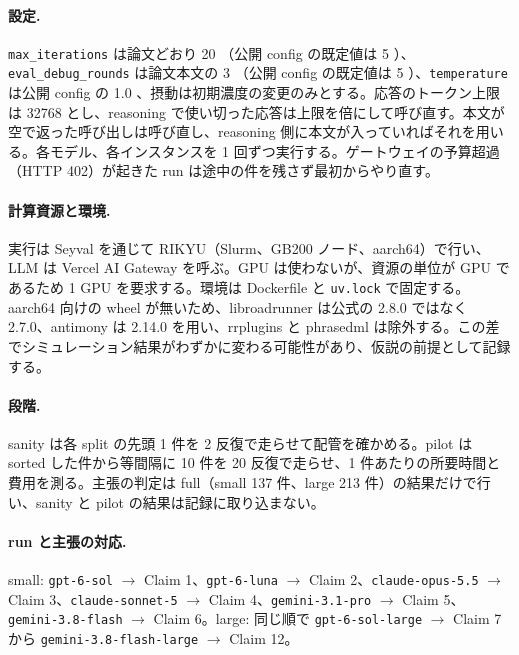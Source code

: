 \documentclass{article}
\begin{document}
\paragraph{設定.}
\texttt{max\_iterations} は論文どおり 20 \cite[s1.p3]{duan-2025-measuring}（公開 config の既定値は 5 \cite[s2.p2]{h4duan-2025-scigym}）、\texttt{eval\_debug\_rounds} は論文本文の 3 \cite[s1.p4]{duan-2025-measuring}（公開 config の既定値は 5 \cite[s2.p3]{h4duan-2025-scigym}）、\texttt{temperature} は公開 config の 1.0 \cite[s2.p1]{h4duan-2025-scigym}、摂動は初期濃度の変更のみとする。応答のトークン上限は 32768 とし、reasoning で使い切った応答は上限を倍にして呼び直す。本文が空で返った呼び出しは呼び直し、reasoning 側に本文が入っていればそれを用いる。各モデル、各インスタンスを 1 回ずつ実行する。ゲートウェイの予算超過（HTTP 402）が起きた run は途中の件を残さず最初からやり直す。

\paragraph{計算資源と環境.}
実行は Seyval を通じて RIKYU（Slurm、GB200 ノード、aarch64）で行い、LLM は Vercel AI Gateway を呼ぶ。GPU は使わないが、資源の単位が GPU であるため 1 GPU を要求する。環境は Dockerfile と \texttt{uv.lock} で固定する。aarch64 向けの wheel が無いため、libroadrunner は公式の 2.8.0 ではなく 2.7.0、antimony は 2.14.0 を用い、rrplugins と phrasedml は除外する。この差でシミュレーション結果がわずかに変わる可能性があり、仮説の前提として記録する。

\paragraph{段階.}
sanity は各 split の先頭 1 件を 2 反復で走らせて配管を確かめる。pilot は sorted した件から等間隔に 10 件を 20 反復で走らせ、1 件あたりの所要時間と費用を測る。主張の判定は full（small 137 件、large 213 件）の結果だけで行い、sanity と pilot の結果は記録に取り込まない。

\paragraph{run と主張の対応.}
small: \texttt{gpt-6-sol} $\to$ Claim 1、\texttt{gpt-6-luna} $\to$ Claim 2、\texttt{claude-opus-5.5} $\to$ Claim 3、\texttt{claude-sonnet-5} $\to$ Claim 4、\texttt{gemini-3.1-pro} $\to$ Claim 5、\texttt{gemini-3.8-flash} $\to$ Claim 6。large: 同じ順で \texttt{gpt-6-sol-large} $\to$ Claim 7 から \texttt{gemini-3.8-flash-large} $\to$ Claim 12。
\end{document}
